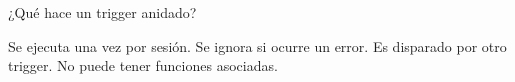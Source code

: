 \question[1] ¿Qué hace un trigger anidado?
\begin{choices}
\choice Se ejecuta una vez por sesión.
\choice Se ignora si ocurre un error.
\CorrectChoice Es disparado por otro trigger.
\choice No puede tener funciones asociadas.
\end{choices}